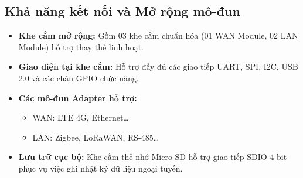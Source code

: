 \subsection{Khả năng kết nối và Mở rộng mô-đun}
    \begin{itemize}
        \item \textbf{Khe cắm mở rộng:} Gồm 03 khe cắm chuẩn hóa (01 WAN Module, 02 LAN Module) hỗ trợ thay thế linh hoạt.
        \item \textbf{Giao diện tại khe cắm:} Hỗ trợ đầy đủ các giao tiếp UART, SPI, I2C, USB 2.0 và các chân GPIO chức năng.
        \item \textbf{Các mô-đun Adapter hỗ trợ:}
        \begin{itemize}
            \item WAN: LTE 4G, Ethernet\dots
            \item LAN: Zigbee, LoRaWAN, RS-485\dots
        \end{itemize}
        \item \textbf{Lưu trữ cục bộ:} Khe cắm thẻ nhớ Micro SD hỗ trợ giao tiếp SDIO 4-bit phục vụ việc ghi nhật ký dữ liệu ngoại tuyến.
    \end{itemize}